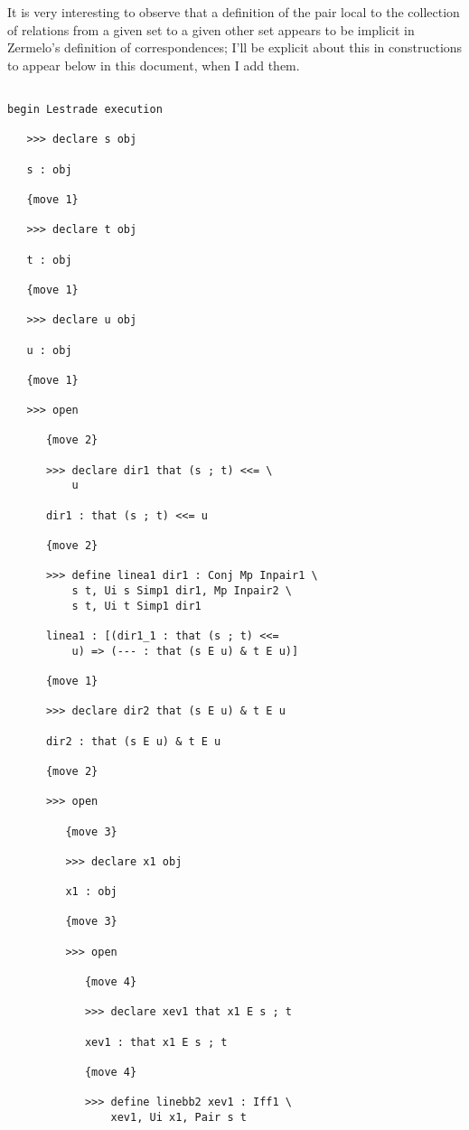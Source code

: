 \documentclass[12pt]{article}
\begin{document}
It is very interesting to observe that a definition of the pair local to the collection of relations from a given set to a given other set appears to be implicit in Zermelo's definition of correspondences;  I'll be explicit about this in constructions to appear below in this document, when I add them.

\begin{verbatim}

begin Lestrade execution

   >>> declare s obj

   s : obj

   {move 1}

   >>> declare t obj

   t : obj

   {move 1}

   >>> declare u obj

   u : obj

   {move 1}

   >>> open

      {move 2}

      >>> declare dir1 that (s ; t) <<= \
          u

      dir1 : that (s ; t) <<= u

      {move 2}

      >>> define linea1 dir1 : Conj Mp Inpair1 \
          s t, Ui s Simp1 dir1, Mp Inpair2 \
          s t, Ui t Simp1 dir1

      linea1 : [(dir1_1 : that (s ; t) <<= 
          u) => (--- : that (s E u) & t E u)]

      {move 1}

      >>> declare dir2 that (s E u) & t E u

      dir2 : that (s E u) & t E u

      {move 2}

      >>> open

         {move 3}

         >>> declare x1 obj

         x1 : obj

         {move 3}

         >>> open

            {move 4}

            >>> declare xev1 that x1 E s ; t

            xev1 : that x1 E s ; t

            {move 4}

            >>> define linebb2 xev1 : Iff1 \
                xev1, Ui x1, Pair s t


\end{verbatim}
\end{document}
